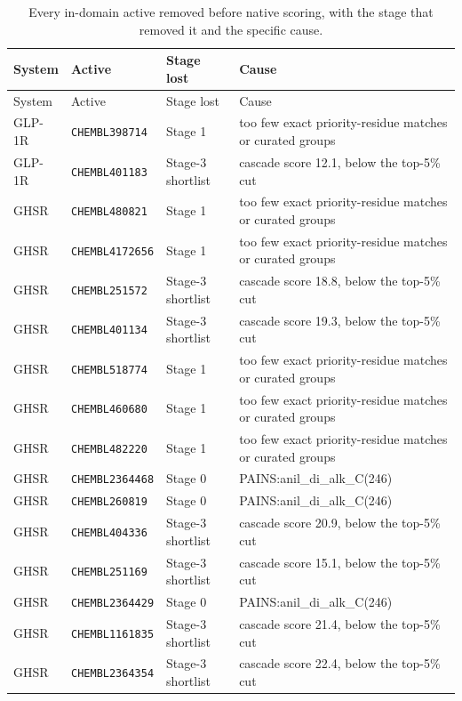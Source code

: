 {\footnotesize
\begin{longtable}{@{}llp{}p{}@{}}
\caption{Every in-domain active removed before native scoring, with the stage that
removed it and the specific cause.}
\label{tab:attrition_full}\\
\hline
System & Active & Stage lost & Cause \\
\hline
\endfirsthead
\hline
System & Active & Stage lost & Cause \\
\hline
\endhead
GLP-1R & \texttt{CHEMBL398714} & Stage 1 & too few exact priority-residue matches or curated groups \\
GLP-1R & \texttt{CHEMBL401183} & Stage-3 shortlist & cascade score 12.1, below the top-5\% cut \\
GHSR & \texttt{CHEMBL480821} & Stage 1 & too few exact priority-residue matches or curated groups \\
GHSR & \texttt{CHEMBL4172656} & Stage 1 & too few exact priority-residue matches or curated groups \\
GHSR & \texttt{CHEMBL251572} & Stage-3 shortlist & cascade score 18.8, below the top-5\% cut \\
GHSR & \texttt{CHEMBL401134} & Stage-3 shortlist & cascade score 19.3, below the top-5\% cut \\
GHSR & \texttt{CHEMBL518774} & Stage 1 & too few exact priority-residue matches or curated groups \\
GHSR & \texttt{CHEMBL460680} & Stage 1 & too few exact priority-residue matches or curated groups \\
GHSR & \texttt{CHEMBL482220} & Stage 1 & too few exact priority-residue matches or curated groups \\
GHSR & \texttt{CHEMBL2364468} & Stage 0 & PAINS:anil\_di\_alk\_C(246) \\
GHSR & \texttt{CHEMBL260819} & Stage 0 & PAINS:anil\_di\_alk\_C(246) \\
GHSR & \texttt{CHEMBL404336} & Stage-3 shortlist & cascade score 20.9, below the top-5\% cut \\
GHSR & \texttt{CHEMBL251169} & Stage-3 shortlist & cascade score 15.1, below the top-5\% cut \\
GHSR & \texttt{CHEMBL2364429} & Stage 0 & PAINS:anil\_di\_alk\_C(246) \\
GHSR & \texttt{CHEMBL1161835} & Stage-3 shortlist & cascade score 21.4, below the top-5\% cut \\
GHSR & \texttt{CHEMBL2364354} & Stage-3 shortlist & cascade score 22.4, below the top-5\% cut \\

\end{longtable}}
